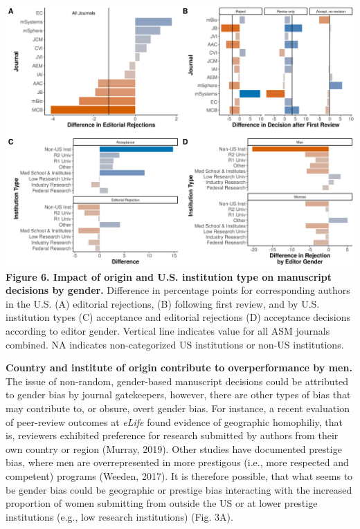 \documentclass[11pt,]{article}
\begin{document}
\includegraphics{Figure_6.png} \textbf{Figure 6. Impact of origin and
U.S. institution type on manuscript decisions by gender.} Difference in
percentage points for corresponding authors in the U.S. (A) editorial
rejections, (B) following first review, and by U.S. institution types
(C) acceptance and editorial rejections (D) acceptance decisions
according to editor gender. Vertical line indicates value for all ASM
journals combined. NA indicates non-categorized US institutions or
non-US institutions.

\textbf{Country and institute of origin contribute to overperformance by
men.} The issue of non-random, gender-based manuscript decisions could
be attributed to gender bias by journal gatekeepers, however, there are
other types of bias that may contribute to, or obsure, overt gender
bias. For instance, a recent evaluation of peer-review outcomes at
\emph{eLife} found evidence of geographic homophiliy, that is, reviewers
exhibited preference for research submitted by authors from their own
country or region (Murray, 2019). Other studies have documented prestige
bias, where men are overrepresented in more prestigous (i.e., more
respected and competent) programs (Weeden, 2017). It is therefore
possible, that what seems to be gender bias could be geographic or
prestige bias interacting with the increased proportion of women
submitting from outside the US or at lower prestige institutions (e.g.,
low research institutions) (Fig. 3A).
\end{document}
